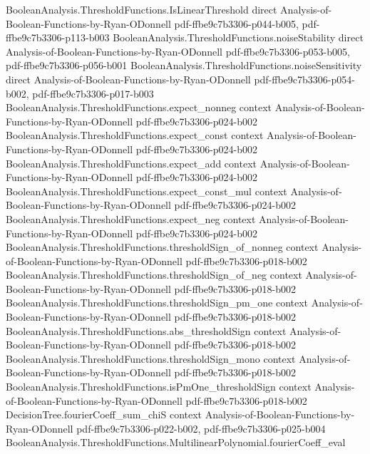 \begin{theorem}
\proofstep
  {BooleanAnalysis.ThresholdFunctions.IsLinearThreshold}
  {direct}
  {Analysis-of-Boolean-Functions-by-Ryan-ODonnell}
  {pdf-ffbe9c7b3306-p044-b005,
    pdf-ffbe9c7b3306-p113-b003}
\proofstep
  {BooleanAnalysis.ThresholdFunctions.noiseStability}
  {direct}
  {Analysis-of-Boolean-Functions-by-Ryan-ODonnell}
  {pdf-ffbe9c7b3306-p053-b005,
    pdf-ffbe9c7b3306-p056-b001}
\proofstep
  {BooleanAnalysis.ThresholdFunctions.noiseSensitivity}
  {direct}
  {Analysis-of-Boolean-Functions-by-Ryan-ODonnell}
  {pdf-ffbe9c7b3306-p054-b002,
    pdf-ffbe9c7b3306-p017-b003}
\proofstep
  {BooleanAnalysis.ThresholdFunctions.expect_nonneg}
  {context}
  {Analysis-of-Boolean-Functions-by-Ryan-ODonnell}
  {pdf-ffbe9c7b3306-p024-b002}
\proofstep
  {BooleanAnalysis.ThresholdFunctions.expect_const}
  {context}
  {Analysis-of-Boolean-Functions-by-Ryan-ODonnell}
  {pdf-ffbe9c7b3306-p024-b002}
\proofstep
  {BooleanAnalysis.ThresholdFunctions.expect_add}
  {context}
  {Analysis-of-Boolean-Functions-by-Ryan-ODonnell}
  {pdf-ffbe9c7b3306-p024-b002}
\proofstep
  {BooleanAnalysis.ThresholdFunctions.expect_const_mul}
  {context}
  {Analysis-of-Boolean-Functions-by-Ryan-ODonnell}
  {pdf-ffbe9c7b3306-p024-b002}
\proofstep
  {BooleanAnalysis.ThresholdFunctions.expect_neg}
  {context}
  {Analysis-of-Boolean-Functions-by-Ryan-ODonnell}
  {pdf-ffbe9c7b3306-p024-b002}
\proofstep
  {BooleanAnalysis.ThresholdFunctions.thresholdSign_of_nonneg}
  {context}
  {Analysis-of-Boolean-Functions-by-Ryan-ODonnell}
  {pdf-ffbe9c7b3306-p018-b002}
\proofstep
  {BooleanAnalysis.ThresholdFunctions.thresholdSign_of_neg}
  {context}
  {Analysis-of-Boolean-Functions-by-Ryan-ODonnell}
  {pdf-ffbe9c7b3306-p018-b002}
\proofstep
  {BooleanAnalysis.ThresholdFunctions.thresholdSign_pm_one}
  {context}
  {Analysis-of-Boolean-Functions-by-Ryan-ODonnell}
  {pdf-ffbe9c7b3306-p018-b002}
\proofstep
  {BooleanAnalysis.ThresholdFunctions.abs_thresholdSign}
  {context}
  {Analysis-of-Boolean-Functions-by-Ryan-ODonnell}
  {pdf-ffbe9c7b3306-p018-b002}
\proofstep
  {BooleanAnalysis.ThresholdFunctions.thresholdSign_mono}
  {context}
  {Analysis-of-Boolean-Functions-by-Ryan-ODonnell}
  {pdf-ffbe9c7b3306-p018-b002}
\proofstep
  {BooleanAnalysis.ThresholdFunctions.isPmOne_thresholdSign}
  {context}
  {Analysis-of-Boolean-Functions-by-Ryan-ODonnell}
  {pdf-ffbe9c7b3306-p018-b002}
\proofstep
  {DecisionTree.fourierCoeff_sum_chiS}
  {context}
  {Analysis-of-Boolean-Functions-by-Ryan-ODonnell}
  {pdf-ffbe9c7b3306-p022-b002,
    pdf-ffbe9c7b3306-p025-b004}
\proofstep
  {BooleanAnalysis.ThresholdFunctions.MultilinearPolynomial.fourierCoeff_eval}

\end{theorem}
